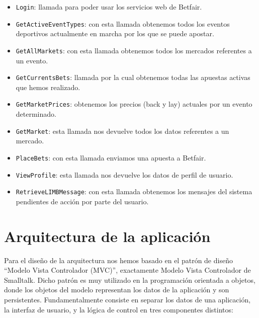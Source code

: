 \begin{itemize}
	\item \lstinline{Login}: 
		llamada para poder usar los servicios web de Betfair. 
	\item \lstinline{GetActiveEventTypes}: 
		con esta llamada obtenemos todos los eventos deportivos actualmente en marcha por los que se puede apostar.
	\item  \lstinline{GetAllMarkets}:
		con esta llamada obtenemos todos los mercados referentes a un evento.
	\item  \lstinline{GetCurrentsBets}:
		llamada por la cual obtenemos todas las apuestas activas que hemos realizado.
	\item  \lstinline{GetMarketPrices}:
		obtenemos los precios (back y lay) actuales por un evento determinado.
	\item  \lstinline{GetMarket}:
		esta llamada nos devuelve todos los datos referentes a un mercado.
	\item  \lstinline{PlaceBets}:
		con esta llamada enviamos una apuesta a Betfair.
	\item  \lstinline{ViewProfile}: 
		esta llamada nos devuelve los datos de perfil de usuario.
	\item  \lstinline{RetrieveLIMBMessage}:
		 con esta llamada obtenemos los mensajes del sistema pendientes de acción por parte del usuario.
\end{itemize}

\section{Arquitectura de la aplicación}


 Para el diseño de la arquitectura nos hemos basado en el patrón de diseño ``Modelo Vista Controlador (MVC)'', exactamente Modelo Vista Controlador de Smalltalk. Dicho patrón es muy utilizado en la programación orientada a objetos, donde los objetos del modelo representan los datos de la aplicación y son persistentes. Fundamentalmente consiste en separar los datos de una aplicación, la interfaz de usuario, y la lógica de control en tres componentes distintos:

